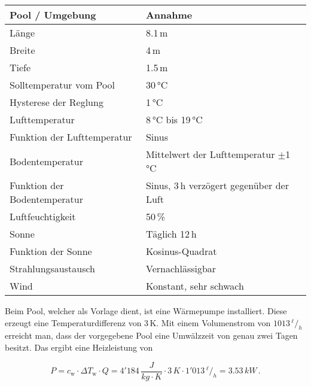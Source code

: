 \begin{table}[H]
	\centering
	\renewcommand{\arraystretch}{1.2}
	\begin{tabular}{l|l}
		\textbf{Pool / Umgebung}     & \textbf{Annahme}                         \\ \hline
		Länge                        & 8.1\,m                                   \\
		Breite                       & 4\,m                                     \\
		Tiefe                        & 1.5\,m                                   \\
		Solltemperatur vom Pool      & 30\,°C                                   \\
		Hysterese der Reglung		 & 1\,°C                                    \\
		Lufttemperatur      		 & 8\,°C bis 19\,°C                         \\
		Funktion der Lufttemperatur  & Sinus                                    \\
		Bodentemperatur              & Mittelwert der Lufttemperatur $\pm$1\,°C \\
		Funktion der Bodentemperatur & Sinus, 3\,h verzögert gegenüber der Luft \\
		Luftfeuchtigkeit             & 50\,\%                                   \\
		Sonne                        & Täglich 12\,h                            \\
		Funktion der Sonne           & Kosinus-Quadrat                          \\
		Strahlungsaustausch			 & Vernachlässigbar						    \\
		Wind						 & Konstant, sehr schwach
	\end{tabular}
\end{table}

Beim Pool, welcher als Vorlage dient, ist eine Wärmepumpe installiert. Diese erzeugt eine Temperaturdifferenz von 3\,K. Mit einem Volumenstrom von $1013\,^{\si{\ell}}\!/_{\si{h}}$ erreicht man, dass der vorgegebene Pool eine Umwälzzeit von genau zwei Tagen besitzt. Das ergibt eine Heizleistung von

\begin{equation}
	P = c_\text{w} \cdot \Delta T_\text{w} \cdot Q = 4'184\,\frac{\si{J}}{\si{kg} \cdot \si{K}} \cdot 3\,\si{K} \cdot 1'013\,^{\si{\ell}}\!/_{\si{h}} = 3.53\,\si{kW}\,.
	\label{eq:Energie Wärmepumpe}
\end{equation}

